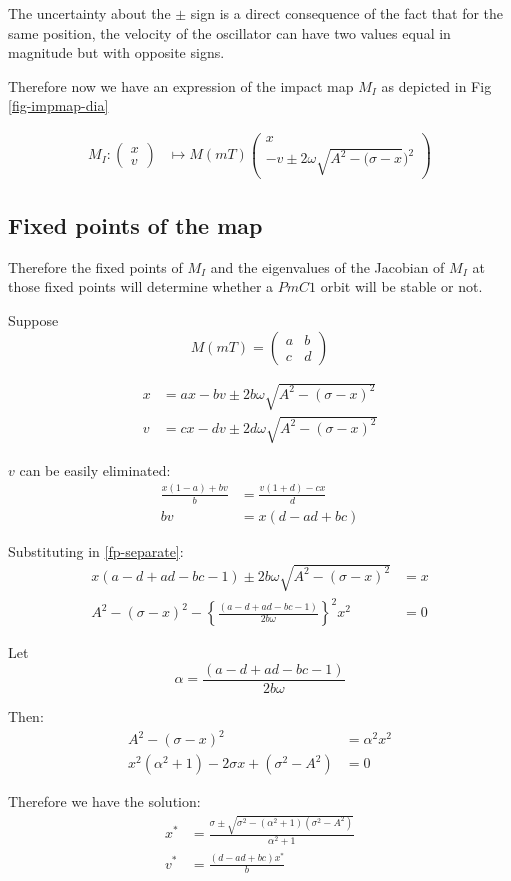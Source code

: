 \documentclass{book}
\renewcommand{\(}{\begin{columns}}
\renewcommand{\)}{\end{columns}}
\newcommand{\<}[1]{\begin{column}{#1}}
\renewcommand{\>}{\end{column}}
\newcommand{\colv}[2]{\begin{pmatrix}#1\\#2\end{pmatrix}}
\begin{document}
The uncertainty about the $\pm$  sign is a 
direct consequence of the fact that for the same position, the velocity of the 
oscillator can have two values equal in magnitude but with opposite signs.  

Therefore now we have an expression of the impact map $M_I$ as depicted in Fig \ref{fig-impmap-dia}

\begin{align}
\label{def-mi}
M_I:\colv{x}{v}&\mapsto M(mT)\colv{x}{-v\pm2\omega \sqrt{A^2-(\sigma-x})^2}
\end{align}


\subsection{Fixed points of the map}
Therefore the fixed points of $M_I$ and the eigenvalues of the Jacobian of 
$M_I$ at those fixed points will determine whether a $PmC1$ orbit will be 
stable or not.  

Suppose
\[
M(mT)=
\begin{pmatrix}
a & b\\
c & d
\end{pmatrix}
\]

\begin{align}
\label{fp-separate}
x&=ax-bv \pm 2b\omega\sqrt{A^2-(\sigma-x)^2}\\
v&=cx-dv \pm 2d\omega\sqrt{A^2-(\sigma-x)^2}
\end{align}

$v$ can be easily eliminated:
\begin{align*}
\frac{x(1-a)+bv}{b}&=\frac{v(1+d)-cx}{d}\\
bv&=x(d-ad+bc)
\end{align*}

Substituting in \eqref{fp-separate}:
\begin{align*}
x(a-d+ad-bc-1)\pm 2b\omega\sqrt{A^2-(\sigma-x)^2}&=x\\
A^2-(\sigma-x)^2-\left\{\frac{(a-d+ad-bc-1)}{2b\omega}\right\}^2x^2&=0
\end{align*}


Let \[
\alpha=\frac{(a-d+ad-bc-1)}{2b\omega}
\]

Then:
\begin{align*}
A^2-(\sigma-x)^2&=\alpha^2x^2\\
x^2(\alpha^2+1)-2\sigma x+(\sigma^2-A^2)&=0
\end{align*}

Therefore we have the solution:
\begin{align}
\label{fp-solution}
x^*&=\frac{\sigma\pm\sqrt{\sigma^2-(\alpha^2+1)(\sigma^2-A^2)}}{\alpha^2+1}\\
v^*&=\frac{(d-ad+bc)x^*}{b}
\end{align}
\end{document}
